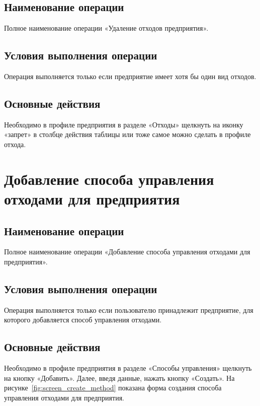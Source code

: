 \documentclass[a4paper]{G2-105}
\begin{document}
\ttl

\subsection{Наименование операции}

Полное наименование операции «Удаление отходов предприятия».

\subsection{Условия выполнения операции}

Операция выполняется только если предприятие имеет хотя бы один вид отходов.

\subsection{Основные действия}

Необходимо в профиле предприятия в разделе «Отходы» щелкнуть на иконку «запрет» в столбце действия таблицы или тоже самое можно сделать в профиле отхода.

\section{Добавление способа управления отходами для предприятия}

\ttl

\subsection{Наименование операции}

Полное наименование операции «Добавление способа управления отходами для предприятия».

\subsection{Условия выполнения операции}

Операция выполняется только если пользователю принадлежит предприятие, для которого добавляется способ управления отходами.

\subsection{Основные действия}

Необходимо в профиле предприятия в разделе «Способы управления» щелкнуть на кнопку «Добавить». Далее, введя данные, нажать кнопку «Создать». На рисунке~\ref{fig:screen_create_method} показана форма создания способа управления отходами для предприятия.
\end{document}

